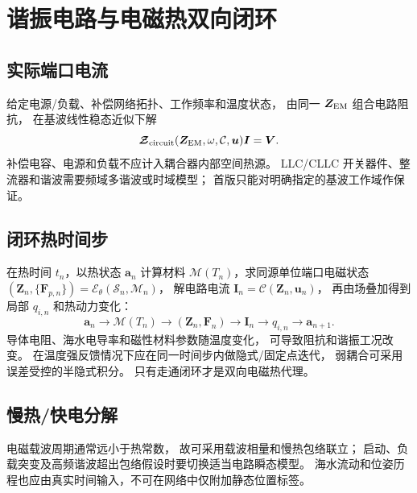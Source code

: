 \section{谐振电路与电磁热双向闭环}\label{sec:circuit}
\subsection{实际端口电流}
给定电源/负载、补偿网络拓扑、工作频率和温度状态，
由同一 \(\bm Z_{\rm EM}\) 组合电路阻抗，
在基波线性稳态近似下解
\[
\bm{\mathcal Z}_{\rm circuit}(\bm Z_{\rm EM},\omega,\mathcal C,\bm u)
\bm I=\bm V.
\]
补偿电容、电源和负载不应计入耦合器内部空间热源。
LLC/CLLC 开关器件、整流器和谐波需要频域多谐波或时域模型；
首版只能对明确指定的基波工作域作保证。

\subsection{闭环热时间步}
在热时间 \(t_n\)，以热状态 \(\bm a_n\) 计算材料
\(\mathcal M(T_n)\)，求同源单位端口电磁状态
\((\bm Z_n,\{\bm F_{p,n}\})=\mathcal E_\theta(\mathcal S_n,\mathcal M_n)\)，
解电路电流 \(\bm I_n=\mathcal C(\bm Z_n,\bm u_n)\)，
再由场叠加得到局部 \(q_{i,n}\) 和热动力变化：
\begin{equation}
\boxed{
\bm a_n\longrightarrow \mathcal M(T_n)
\longrightarrow(\bm Z_n,\bm F_n)
\longrightarrow\bm I_n
\longrightarrow q_{i,n}
\longrightarrow\bm a_{n+1}.
}\label{eq:feedback}
\end{equation}
导体电阻、海水电导率和磁性材料参数随温度变化，
可导致阻抗和谐振工况改变。
在温度强反馈情况下应在同一时间步内做隐式/固定点迭代，
弱耦合可采用误差受控的半隐式积分。
只有走通闭环才是双向电磁热代理。

\subsection{慢热/快电分解}
电磁载波周期通常远小于热常数，
故可采用载波相量和慢热包络联立；
启动、负载突变及高频谐波超出包络假设时要切换适当电路瞬态模型。
海水流动和位姿历程也应由真实时间输入，不可在网络中仅附加静态位置标签。
